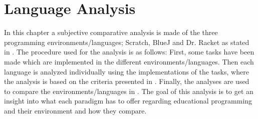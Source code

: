\chapter{Language Analysis}
\label{chap:language_analysis}
In this chapter a subjective comparative analysis is made of the three programming environments/languages; Scratch, BlueJ and Dr. Racket as stated in . The procedure used for the analysis is as follows: First, some tasks have been made which are implemented in the different environments/languages. Then each language is analyzed individually using the implementations of the tasks, where the analysis is based on the criteria presented in . Finally, the analyses are used to compare the environments/languages in .  The goal of this analysis is to get an insight into what each paradigm has to offer regarding educational programming and their environment and how they compare. 

